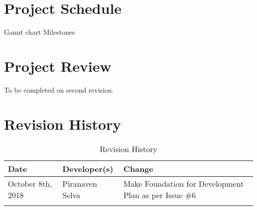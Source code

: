 \documentclass{article}
\begin{document}
\section{Project Schedule}

Gannt chart \newline
Milestones \newline


\section{Project Review}

To be completed on second revision. 

\newpage
\section{Revision History}
\begin{table}[hp]
\caption{Revision History} \label{TblRevisionHistory}
\begin{tabularx}{\textwidth}{llX}
\toprule
\textbf{Date} & \textbf{Developer(s)} & \textbf{Change}\\
\midrule
October 8th, 2018 &Piranaven Selva & Make Foundation for Development Plan as per Issue \#6 \\
\\
\bottomrule
\end{tabularx}
\end{table}
\end{document}
